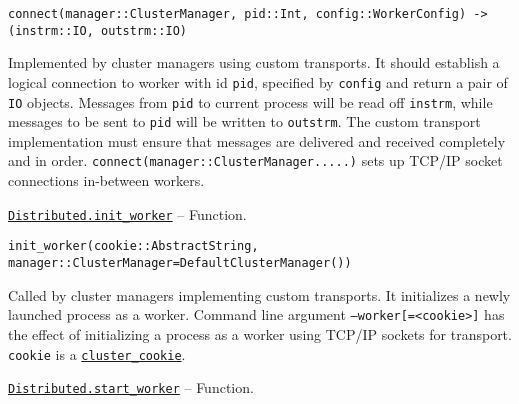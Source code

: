 \begin{adjustwidth}{2em}{0pt}


\begin{verbatim}
connect(manager::ClusterManager, pid::Int, config::WorkerConfig) -> (instrm::IO, outstrm::IO)
\end{verbatim}

Implemented by cluster managers using custom transports. It should establish a logical connection to worker with id \texttt{pid}, specified by \texttt{config} and return a pair of \texttt{IO} objects. Messages from \texttt{pid} to current process will be read off \texttt{instrm}, while messages to be sent to \texttt{pid} will be written to \texttt{outstrm}. The custom transport implementation must ensure that messages are delivered and received completely and in order. \texttt{connect(manager::ClusterManager.....)} sets up TCP/IP socket connections in-between workers.



\end{adjustwidth}
\hypertarget{12889811459778306363}{} 
\hyperlink{12889811459778306363}{\texttt{Distributed.init\_worker}}  -- {Function.}

\begin{adjustwidth}{2em}{0pt}


\begin{verbatim}
init_worker(cookie::AbstractString, manager::ClusterManager=DefaultClusterManager())
\end{verbatim}

Called by cluster managers implementing custom transports. It initializes a newly launched process as a worker. Command line argument \texttt{--worker[=<cookie>]} has the effect of initializing a process as a worker using TCP/IP sockets for transport. \texttt{cookie} is a \hyperlink{914110747490695974}{\texttt{cluster\_cookie}}.



\end{adjustwidth}
\hypertarget{3765538736204641537}{} 
\hyperlink{3765538736204641537}{\texttt{Distributed.start\_worker}}  -- {Function.}

